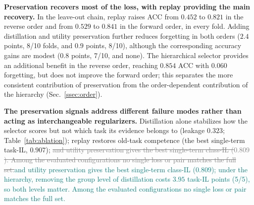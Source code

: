 \documentclass{article}
\newif\ifmarkup \markuptrue
\newcommand{\repc}[3]{\ifmarkup\textcolor{gray}{\sout{#2}}\textcolor{#1}{#3}\else#3\fi}
\newcommand{\repG}[2]{\repc{teal}{#1}{#2}}    %
\begin{document}
\textbf{Preservation recovers most of the loss, with replay providing the main recovery.} In the leave-out chain, replay raises ACC from $0.452$ to $0.821$ in the reverse order and from $0.529$ to $0.841$ in the forward order, in every fold. Adding distillation and utility preservation further reduces forgetting in both orders ($2.4$ points, 8/10 folds, and $0.9$ points, 8/10), although the corresponding accuracy gains are modest ($0.8$ points, 7/10, and none). The hierarchical selector provides an additional benefit in the reverse order, reaching $0.854$ ACC with $0.060$ forgetting, but does not improve the forward order; this separates the more consistent contribution of preservation from the order-dependent contribution of the hierarchy (Sec.~\ref{ssec:order}).

\begin{table}[!htb]
\centering\footnotesize\renewcommand{\arraystretch}{0.92}
\setlength{\tabcolsep}{3.5pt}
\caption{\textbf{Preservation-component ablation with selection-level metrics} (flat, fold 1, 5-seed means). Jaccard and $\Delta U$ are reported for the sequential arms; $\Delta U$ is the per-slide mean change of $U=\log C-\mathrm{CE}$ (logit scale 56.3) on old-task test slides, averaged over old tasks.}
\label{tab:ablation}
\end{table}

\textbf{The preservation signals address different failure modes rather than acting as interchangeable regularizers.} Distillation alone stabilizes how the selector scores but not which task its evidence belongs to (leakage $0.323$; Table~\ref{tab:ablation}); replay restores old-task competence (the best single-term task-IL, $0.907$); \repG{and utility preservation gives the best single-term class-IL ($0.809$). Among the evaluated configurations no single loss or pair matches the full set.}{and utility preservation gives the best single-term class-IL ($0.809$); under the hierarchy, removing the group level of distillation costs $3.95$ task-IL points (5/5), so both levels matter. Among the evaluated configurations no single loss or pair matches the full set.}
\end{document}
